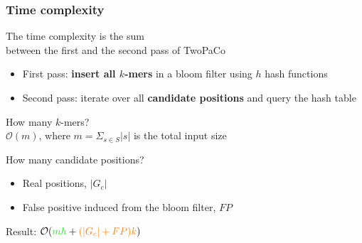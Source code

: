 \begin{frame}
  
	\frametitle{Time complexity}

  \centering
	
	The time complexity is the sum \\ between the first and the second pass of TwoPaCo \\
	
	\bigskip
	
	\begin{itemize}
	  \item[\textcolor{green}{\textbullet}]First pass: \textbf{insert all $k$-mers} in a bloom filter using $h$ hash functions
	  \item[\textcolor{orange}{\textbullet}] Second pass: iterate over all \textbf{candidate positions} and query the hash table
	\end{itemize}
	
	\bigskip
	
	\pause
	
	How many $k$-mers? \\
	
	$\mathcal{O}(m)$, where $m = \Sigma_{s \in S}{ |s| }$ is the total input size
	
	\bigskip
	 
	\pause
	
	How many candidate positions?
	
	\begin{itemize}
	  \item Real positions, $|G_{c}|$
	  \item False positive induced from the bloom filter, $FP$
	\end{itemize}

	\medskip
	
	\pause
	
	Result: $\mathcal{O}({\color{green}mh} + {\color{orange}(|G_{c}| + FP)k})$
	
	
\end{frame}



